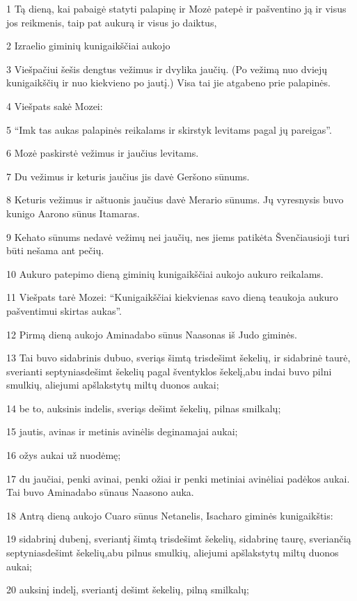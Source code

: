 \par 1 Tą dieną, kai pabaigė statyti palapinę ir Mozė patepė ir pašventino ją ir visus jos reikmenis, taip pat aukurą ir visus jo daiktus, 
\par 2 Izraelio giminių kunigaikščiai aukojo 
\par 3 Viešpačiui šešis dengtus vežimus ir dvylika jaučių. (Po vežimą nuo dviejų kunigaikščių ir nuo kiekvieno po jautį.) Visa tai jie atgabeno prie palapinės. 
\par 4 Viešpats sakė Mozei: 
\par 5 “Imk tas aukas palapinės reikalams ir skirstyk levitams pagal jų pareigas”. 
\par 6 Mozė paskirstė vežimus ir jaučius levitams. 
\par 7 Du vežimus ir keturis jaučius jis davė Geršono sūnums. 
\par 8 Keturis vežimus ir aštuonis jaučius davė Merario sūnums. Jų vyresnysis buvo kunigo Aarono sūnus Itamaras. 
\par 9 Kehato sūnums nedavė vežimų nei jaučių, nes jiems patikėta Švenčiausioji turi būti nešama ant pečių. 
\par 10 Aukuro patepimo dieną giminių kunigaikščiai aukojo aukuro reikalams. 
\par 11 Viešpats tarė Mozei: “Kunigaikščiai kiekvienas savo dieną teaukoja aukuro pašventimui skirtas aukas”. 
\par 12 Pirmą dieną aukojo Aminadabo sūnus Naasonas iš Judo giminės. 
\par 13 Tai buvo sidabrinis dubuo, sveriąs šimtą trisdešimt šekelių, ir sidabrinė taurė, sverianti septyniasdešimt šekelių pagal šventyklos šekelį,­abu indai buvo pilni smulkių, aliejumi apšlakstytų miltų duonos aukai; 
\par 14 be to, auksinis indelis, sveriąs dešimt šekelių, pilnas smilkalų; 
\par 15 jautis, avinas ir metinis avinėlis deginamajai aukai; 
\par 16 ožys aukai už nuodėmę; 
\par 17 du jaučiai, penki avinai, penki ožiai ir penki metiniai avinėliai padėkos aukai. Tai buvo Aminadabo sūnaus Naasono auka. 
\par 18 Antrą dieną aukojo Cuaro sūnus Netanelis, Isacharo giminės kunigaikštis: 
\par 19 sidabrinį dubenį, sveriantį šimtą trisdešimt šekelių, sidabrinę taurę, sveriančią septyniasdešimt šekelių,­abu pilnus smulkių, aliejumi apšlakstytų miltų duonos aukai; 
\par 20 auksinį indelį, sveriantį dešimt šekelių, pilną smilkalų; 

